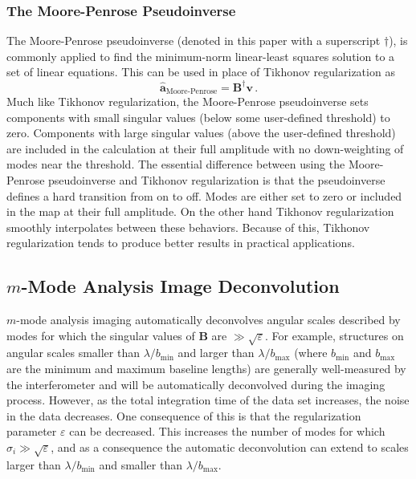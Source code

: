 \documentclass[twocolumn]{aastex61}
\renewcommand{\b}{\pmb}
\begin{document}
\subsubsection{The Moore-Penrose Pseudoinverse}

The Moore-Penrose pseudoinverse (denoted in this paper with a superscript $\dagger$), is commonly
applied to find the minimum-norm linear-least squares solution to a set of linear equations. This
can be used in place of Tikhonov regularization as
\begin{equation}
    \b{\hat a}_\text{Moore-Penrose} = \b B^\dagger\b v\,.
\end{equation}
Much like Tikhonov regularization, the Moore-Penrose pseudoinverse sets components with small
singular values (below some user-defined threshold) to zero. Components with large singular values
(above the user-defined threshold) are included in the calculation at their full amplitude with no
down-weighting of modes near the threshold. The essential difference between using the Moore-Penrose
pseudoinverse and Tikhonov regularization is that the pseudoinverse defines a hard transition from
on to off. Modes are either set to zero or included in the map at their full amplitude. On the other
hand Tikhonov regularization smoothly interpolates between these behaviors. Because of this,
Tikhonov regularization tends to produce better results in practical applications.

\subsection{$m$-Mode Analysis Image Deconvolution}

$m$-mode analysis imaging automatically deconvolves angular scales described by modes for which the
singular values of $\b B$ are $\gg \sqrt{\varepsilon}$. For example, structures on angular scales
smaller than $\lambda/b_\text{min}$ and larger than $\lambda/b_\text{max}$ (where $b_\text{min}$ and
$b_\text{max}$ are the minimum and maximum baseline lengths) are generally well-measured by the
interferometer and will be automatically deconvolved during the imaging process. However, as the
total integration time of the data set increases, the noise in the data decreases. One consequence
of this is that the regularization parameter $\varepsilon$ can be decreased. This increases the
number of modes for which $\sigma_i \gg \sqrt{\varepsilon}$, and as a consequence the automatic
deconvolution can extend to scales larger than $\lambda/b_\text{min}$ and smaller than
$\lambda/b_\text{max}$.
\end{document}
